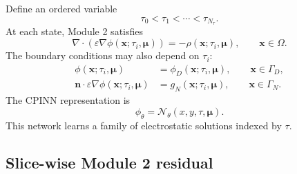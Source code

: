 \documentclass[11pt]{article}
\newcommand{\xv}{\bm{x}}
\newcommand{\muv}{\bm{\mu}}
\newcommand{\nvecb}{\mathbf{n}}
\newcommand{\phinn}{\phi_{\theta}}
\newcommand{\Om}{\Omega}
\newcommand{\taud}{\tau}
\begin{document}
Define an ordered variable
\begin{equation}
\taud_0<\taud_1<\cdots<\taud_{N_\taud}.
\end{equation}
At each state, Module 2 satisfies
\begin{equation}
\nabla\cdot\left(\varepsilon\nabla\phi(\xv;\taud_i,\muv)\right)
=-\rho(\xv;\taud_i,\muv),
\qquad \xv\in\Om.
\label{eq:ordered_poisson_sequence}
\end{equation}
The boundary conditions may also depend on $\taud_i$:
\begin{align}
\phi(\xv;\taud_i,\muv)&=\phi_D(\xv;\taud_i,\muv),\qquad \xv\in\Gamma_D,\label{eq:ordered_dirichlet}\\
\nvecb\cdot\varepsilon\nabla\phi(\xv;\taud_i,\muv)&=g_N(\xv;\taud_i,\muv),\qquad \xv\in\Gamma_N.\label{eq:ordered_neumann}
\end{align}
The CPINN representation is
\begin{equation}
\phinn=\mathcal{N}_{\theta}(x,y,\taud,\muv).
\label{eq:cpinn_network}
\end{equation}
This network learns a family of electrostatic solutions indexed by $\taud$.

\subsection{Slice-wise Module 2 residual}
\end{document}
